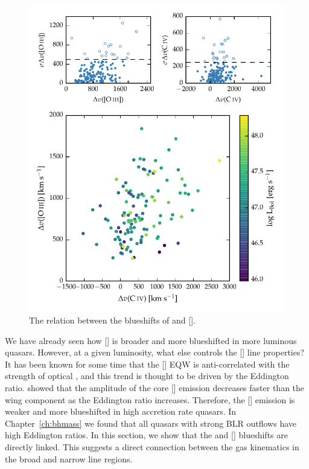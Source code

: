 \begin{figure}
    \includegraphics[width=\columnwidth]{figures/chapter04/civ_blueshift_oiii_blueshift.pdf} 
    \caption[{The relation between the blueshifts of  and [].}]{The relation between the blueshifts of  and [].}     
    \label{fig:oiii_civ_blueshifts}
\end{figure}

We have already seen how [] is broader and more blueshifted in more luminous quasars. 
However, at a given luminosity, what else controls the [] line properties? 
It has been known for some time that the [] \ac{EQW} is anti-correlated with the strength of optical , and this trend is thought to be driven by the Eddington ratio. 
\citet{shen14} showed that the amplitude of the core [] emission decreases faster than the wing component as the Eddington ratio increases. 
Therefore, the [] emission is weaker and more blueshifted in high accretion rate quasars.  
In Chapter~\ref{ch:bhmass} we found that all quasars with strong \ac{BLR} outflows have high Eddington ratios. 
In this section, we show that the  and [] blueshifts are directly linked. 
This suggests a direct connection between the gas kinematics in the broad and narrow line regions. 

